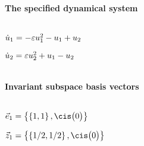 
\(\)
\paragraph{The specified dynamical system}
\(
\)\par

\(\dot u_{1}=-\varepsilon u\sb1^{2}-u\sb1+u\sb2
\)\par

\(\dot u_{2}=\varepsilon u\sb2^{2}+u\sb1-u\sb2
\)\par

\(\)
\paragraph{Invariant subspace basis vectors}
\(
\)\par

\(\vec e_{1}=\left\{
\left\{
1 , 1
\right\} , \cis\big(0\big)
\right\}
\)\par

\(\vec z_{1}=\left\{
\left\{
1/2 , 1/2
\right\} , \cis\big(0\big)
\right\}
\)\par

